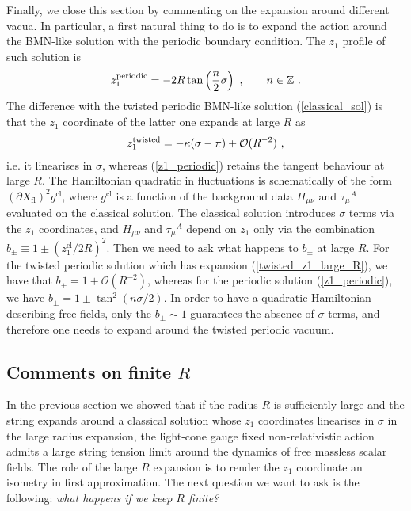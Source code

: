 \documentclass[12pt]{article}
\numberwithin{equation}{section}
\begin{document}
Finally, we close this section by commenting on the expansion around different vacua. In particular, a first natural thing to do is to expand the action around the BMN-like solution with the periodic boundary condition. The $z_1$ profile of such solution is 
\begin{eqnarray}
\label{z1_periodic}
     z_1^{\footnotesize\text{periodic}\normalsize} = -2R \tan \left( \frac{n}{2} \sigma \right) \ , \qquad
     n \in \mathbb{Z} \ .
\end{eqnarray}
The difference with the twisted periodic BMN-like solution (\ref{classical_sol}) is that the $z_1$ coordinate of the latter one expands at large $R$ as
\begin{eqnarray}
\label{twisted_z1_large_R}
    z_1^{\footnotesize\text{twisted}\normalsize} = - \kappa (\sigma - \pi) + \mathcal{O}(R^{-2}) \ , 
\end{eqnarray}
i.e. it linearises in $\sigma$, whereas (\ref{z1_periodic}) retains the tangent behaviour at large $R$. The Hamiltonian quadratic in fluctuations is schematically of the form $(\partial X_{\text{fl}})^2 g^{\text{cl}}$, where $g^{\text{cl}}$ is a function of the background data $H_{\mu\nu}$ and $\tau_{\mu}{}^A$ evaluated on the classical solution. The classical solution introduces $\sigma$ terms via the $z_1$ coordinates, and $H_{\mu\nu}$ and $\tau_{\mu}{}^A$ depend on $z_1$ only via the combination $b_{\pm} \equiv 1 \pm (z^{\text{cl}}_1/ 2R)^2$. Then we need to ask what happens to $b_{\pm}$ at large $R$. For the twisted periodic solution which has expansion (\ref{twisted_z1_large_R}), we have that $b_{\pm} = 1 + \mathcal{O}(R^{-2})$, whereas for the periodic solution (\ref{z1_periodic}), we have  $b_{\pm} = 1 \pm \tan^2 \left(n \sigma /2 \right)$. In order to have a quadratic Hamiltonian describing free fields, only the $b_{\pm} \sim 1$ guarantees the absence of $\sigma$ terms, and therefore one needs to expand around the twisted periodic vacuum.    





\subsection{Comments on finite $R$}
\label{sec:finiteR}

In the previous section we showed that if the radius $R$ is sufficiently large and the string expands around a classical solution whose $z_1$ coordinates linearises in $\sigma$ in the large radius expansion, the light-cone gauge fixed non-relativistic action admits a large string tension limit around the dynamics of free massless scalar fields.
The role of the large $R$ expansion is to render the $z_1$ coordinate an isometry in first approximation. 
The next question we want to ask is the following: \emph{what happens if we keep $R$ finite?}
\end{document}
